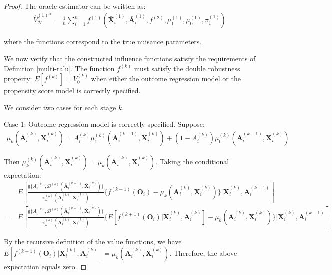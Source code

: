 \documentclass[11pt]{article}
\theoremstyle{referenceplain}
\theoremstyle{referencedefinition}
\theoremstyle{referenceremark}
\begin{document}
\begin{proof}
The oracle estimator can be written as:
\begin{align*}
    \widehat{V}_{\mathcal{D}}^{(1)*} = \frac{1}{n}\sum_{i=1}^n f^{(1)}(\bar{\mathbf{X}}_i^{(1)}, \bar{\mathbf{A}}_i^{(1)}, f^{(2)}, \mu_1^{(1)}, \mu_0^{(1)}, \pi_1^{(1)})
\end{align*}

where the functions correspond to the true nuisance parameters.

We now verify that the constructed influence functions satisfy the requirements of Definition \ref{multi-ralu}. The function $f^{(k)}$ must satisfy the double robustness property: $E[f^{(k)}] = V_0^{(k)}$ when either the outcome regression model or the propensity score model is correctly specified.

We consider two cases for each stage $k$.

Case 1: Outcome regression model is correctly specified. Suppose:
\begin{align*}
    \mu_k(\bar{\mathbf{A}}_i^{(k)}, \bar{\mathbf{X}}_i^{(k)}) = A_i^{(k)} \mu_1^{(k)}(\bar{\mathbf{A}}_i^{(k-1)}, \bar{\mathbf{X}}_i^{(k)}) + (1-A_i^{(k)}) \mu_0^{(k)}(\bar{\mathbf{A}}_i^{(k-1)}, \bar{\mathbf{X}}_i^{(k)})
\end{align*}

Then $\mu_k^{(k)}(\bar{\mathbf{A}}_i^{(k)}, \bar{\mathbf{X}}_i^{(k)}) = \mu_k(\bar{\mathbf{A}}_i^{(k)}, \bar{\mathbf{X}}_i^{(k)})$. Taking the conditional expectation:
\begin{align*}
    &E\left[\frac{\mathrm{g}\{A_i^{(k)}, \mathcal{D}^{(k)}(\bar{\mathbf{A}}_i^{(k-1)}, \bar{\mathbf{X}}_i^{(k)})\}}{\pi_k^{(k)}(\bar{\mathbf{A}}_i^{(k)}, \bar{\mathbf{X}}_i^{(k)})} \{f^{(k+1)}(\mathbf{O}_i) - \mu_k(\bar{\mathbf{A}}_i^{(k)}, \bar{\mathbf{X}}_i^{(k)})\}\bigg|\bar{\mathbf{X}}_i^{(k)}, \bar{\mathbf{A}}_i^{(k-1)}\right]\\
    = &E\left[\frac{\mathrm{g}\{A_i^{(k)}, \mathcal{D}^{(k)}(\bar{\mathbf{A}}_i^{(k-1)}, \bar{\mathbf{X}}_i^{(k)})\}}{\pi_k^{(k)}(\bar{\mathbf{A}}_i^{(k)}, \bar{\mathbf{X}}_i^{(k)})} \{E[f^{(k+1)}(\mathbf{O}_i)|\bar{\mathbf{X}}_i^{(k)}, \bar{\mathbf{A}}_i^{(k)}] - \mu_k(\bar{\mathbf{A}}_i^{(k)}, \bar{\mathbf{X}}_i^{(k)})\}\bigg|\bar{\mathbf{X}}_i^{(k)}, \bar{\mathbf{A}}_i^{(k-1)}\right]
\end{align*}

By the recursive definition of the value functions, we have $E[f^{(k+1)}(\mathbf{O}_i)|\bar{\mathbf{X}}_i^{(k)}, \bar{\mathbf{A}}_i^{(k)}] = \mu_k(\bar{\mathbf{A}}_i^{(k)}, \bar{\mathbf{X}}_i^{(k)})$. Therefore, the above expectation equals zero.


\end{proof}
\end{document}
